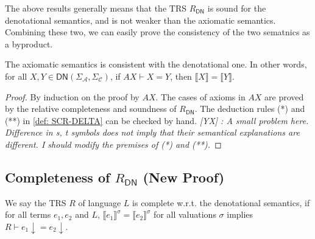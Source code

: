 \documentclass[manuscript, review, timestamp]{acmart}
\newcommand{\yx}[1]{\textit{\color{blue}[YX] : #1}}
\newcommand*{\sem}[1]{{\llbracket #1 \rrbracket}}
\begin{document}
The above results generally means that the TRS $R_\textsf{DN}$ is sound for the denotational semantics, and is not weaker than the axiomatic semantics. Combining these two, we can easily prove the consistency of the two sematnics as a byproduct.

\begin{corollary}
  The axiomatic semantics is consistent with the denotational one. In other words, for all $X, Y \in \textsf{DN}(\Sigma_\mathcal{A}, \Sigma_\mathcal{C})$, if $AX \vdash X = Y$, then $\sem{X} = \sem{Y}$.
\end{corollary}
\begin{proof}
  By induction on the proof by $AX$. The cases of axioms in $AX$ are proved by the relative completeness and soundness of $R_\textsf{DN}$. The deduction rules (*) and (**) in \ref{def: SCR-DELTA} can be checked by hand.
  \yx{A small problem here. Difference in s, t symbols does not imply that their semantical explanations are different. I should modify the premises of (*) and (**).}
\end{proof}

\subsection{Completeness of $R_\textsf{DN}$ (New Proof)}

\begin{definition}[completeness]
  We say the TRS $R$ of language $L$ is complete w.r.t. the denotational semantics, if for all terms $e_1, e_2$ and $L$, 
  $\sem{e_1}^\sigma = \sem{e_2}^\sigma$ for all valuations $\sigma$ implies $R \vdash e_1 \downarrow = e_2 \downarrow$.
\end{definition}
\end{document}
